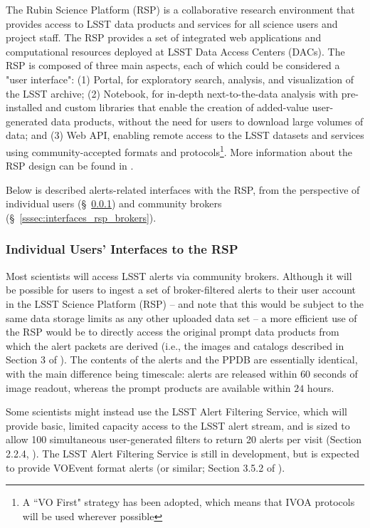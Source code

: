 The Rubin Science Platform (RSP) is a collaborative research environment that provides access to LSST data products and services for all science users and project staff.
The RSP provides a set of integrated web applications and computational resources deployed at LSST Data Access Centers (DACs).
The RSP is composed of three main aspects, each of which could be considered a "user interface":
(1) Portal, for exploratory search, analysis, and visualization of the LSST archive;
(2) Notebook, for in-depth next-to-the-data analysis with pre-installed and custom libraries that enable the creation of added-value user-generated data products, without the need for users to download large volumes of data; and
(3) Web API, enabling remote access to the LSST datasets and services using community-accepted formats and protocols\footnote{A ``VO First" strategy has been adopted, which means that IVOA protocols will be used wherever possible}.
More information about the RSP design can be found in \citet{LSE-319,LDM-542}.

Below is described alerts-related interfaces with the RSP, from the perspective of individual users (\S~\ref{sssec:interfaces_rsp_individual}) and community brokers (\S~\ref{sssec:interfaces_rsp_brokers}).

\subsubsection{Individual Users' Interfaces to the RSP}\label{sssec:interfaces_rsp_individual}

Most scientists will access LSST alerts via community brokers.
Although it will be possible for users to ingest a set of broker-filtered alerts to their user account in the LSST Science Platform (RSP) -- and note that this would be subject to the same data storage limits as any other uploaded data set -- a more efficient use of the RSP would be to directly access the original prompt data products from which the alert packets are derived (i.e., the images and catalogs described in Section 3 of \citealt{LSE-163}).
The contents of the alerts and the PPDB are essentially identical, with the main difference being timescale: alerts are released within $60$ seconds of image readout, whereas the prompt products are available within $24$ hours.

Some scientists might instead use the LSST Alert Filtering Service, which will provide basic, limited capacity access to the LSST alert stream, and is sized to allow 100 simultaneous user-generated filters to return 20 alerts per visit (Section 2.2.4, \citealt{LSE-61}).
The LSST Alert Filtering Service is still in development, but is expected to provide VOEvent format alerts (or similar; Section 3.5.2 of \citealt{LSE-163}).

